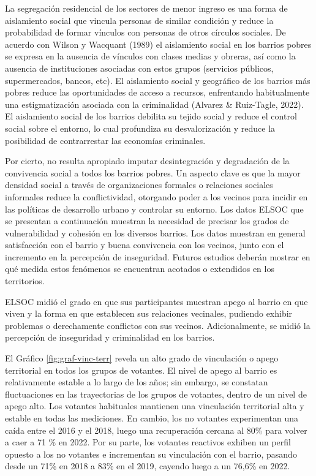 \documentclass[
  12pt,
]{book}
\begin{document}
La segregación residencial de los sectores de menor ingreso es una forma de aislamiento social que vincula personas de similar condición y reduce la probabilidad de formar vínculos con personas de otros círculos sociales. De acuerdo con Wilson y Wacquant (1989) el aislamiento social en los barrios pobres se expresa en la ausencia de vínculos con clases medias y obreras, así como la ausencia de instituciones asociadas con estos grupos (servicios públicos, supermercados, bancos, etc). El aislamiento social y geográfico de los barrios más pobres reduce las oportunidades de acceso a recursos, enfrentando habitualmente una estigmatización asociada con la criminalidad (Alvarez \& Ruiz-Tagle, 2022). El aislamiento social de los barrios debilita su tejido social y reduce el control social sobre el entorno, lo cual profundiza su desvalorización y reduce la posibilidad de contrarrestar las economías criminales.

Por cierto, no resulta apropiado imputar desintegración y degradación de la convivencia social a todos los barrios pobres. Un aspecto clave es que la mayor densidad social a través de organizaciones formales o relaciones sociales informales reduce la conflictividad, otorgando poder a los vecinos para incidir en las políticas de desarrollo urbano y controlar su entorno. Los datos ELSOC que se presentan a continuación muestran la necesidad de precisar los grados de vulnerabilidad y cohesión en los diversos barrios. Los datos muestran en general satisfacción con el barrio y buena convivencia con los vecinos, junto con el incremento en la percepción de inseguridad. Futuros estudios deberán mostrar en qué medida estos fenómenos se encuentran acotados o extendidos en los territorios.

ELSOC midió el grado en que sus participantes muestran apego al barrio en que viven y la forma en que establecen sus relaciones vecinales, pudiendo exhibir problemas o derechamente conflictos con sus vecinos. Adicionalmente, se midió la percepción de inseguridad y criminalidad en los barrios.

El Gráfico \ref{fig:graf-vinc-terr} revela un alto grado de vinculación o apego territorial en todos los grupos de votantes. El nivel de apego al barrio es relativamente estable a lo largo de los años; sin embargo, se constatan fluctuaciones en las trayectorias de los grupos de votantes, dentro de un nivel de apego alto. Los votantes habituales mantienen una vinculación territorial alta y estable en todas las mediciones. En cambio, los no votantes experimentan una caída entre el 2016 y el 2018, luego una recuperación cercana al 80\% para volver a caer a 71 \% en 2022. Por su parte, los votantes reactivos exhiben un perfil opuesto a los no votantes e incrementan su vinculación con el barrio, pasando desde un 71\% en 2018 a 83\% en el 2019, cayendo luego a un 76,6\% en 2022.
\end{document}
